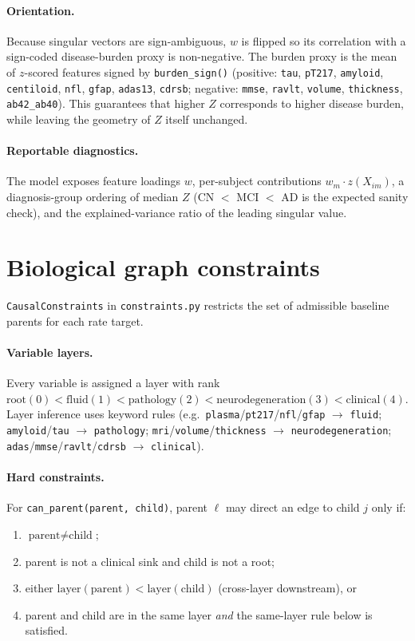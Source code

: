 \documentclass[11pt]{article}
\newcommand{\code}[1]{\texttt{#1}}
\begin{document}
\paragraph{Orientation.} Because singular vectors are sign-ambiguous, $w$
is flipped so its correlation with a sign-coded disease-burden proxy is
non-negative. The burden proxy is the mean of $z$-scored features signed by
\code{burden\_sign()} (positive: \code{tau}, \code{pT217}, \code{amyloid},
\code{centiloid}, \code{nfl}, \code{gfap}, \code{adas13}, \code{cdrsb};
negative: \code{mmse}, \code{ravlt}, \code{volume}, \code{thickness},
\code{ab42\_ab40}). This guarantees that higher $Z$ corresponds to higher
disease burden, while leaving the geometry of $Z$ itself unchanged.

\paragraph{Reportable diagnostics.} The model exposes feature loadings $w$,
per-subject contributions $w_m \cdot z(X_{im})$, a diagnosis-group ordering
of median $Z$ (CN $<$ MCI $<$ AD is the expected sanity check), and the
explained-variance ratio of the leading singular value.

\section{Biological graph constraints}

\code{CausalConstraints} in \code{constraints.py} restricts the set of
admissible baseline parents for each rate target.

\paragraph{Variable layers.} Every variable is assigned a layer with rank
$\text{root}(0) < \text{fluid}(1) < \text{pathology}(2) < \text{neurodegeneration}(3) < \text{clinical}(4)$.
Layer inference uses keyword rules
(e.g.\ \code{plasma}/\code{pt217}/\code{nfl}/\code{gfap} $\to$ \code{fluid};
\code{amyloid}/\code{tau} $\to$ \code{pathology};
\code{mri}/\code{volume}/\code{thickness} $\to$ \code{neurodegeneration};
\code{adas}/\code{mmse}/\code{ravlt}/\code{cdrsb} $\to$ \code{clinical}).

\paragraph{Hard constraints.} For \code{can\_parent(parent, child)}, parent
$\ell$ may direct an edge to child $j$ only if:
\begin{enumerate}[leftmargin=*,nosep]
  \item $\text{parent} \neq \text{child}$;
  \item parent is not a clinical sink and child is not a root;
  \item either $\mathrm{layer}(\text{parent}) < \mathrm{layer}(\text{child})$ (cross-layer downstream), or
  \item parent and child are in the same layer \emph{and} the same-layer rule below is satisfied.
\end{enumerate}
\end{document}
